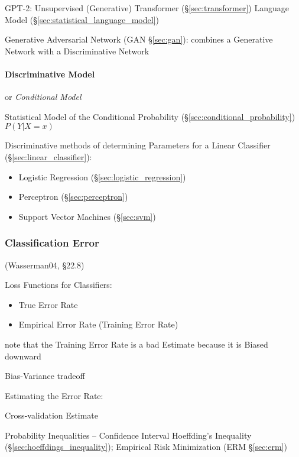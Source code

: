 GPT-2: Unsupervised (Generative) Transformer (\S\ref{sec:transformer}) Language
Model (\S\ref{sec:statistical_language_model})

\fist Generative Adversarial Network (GAN \S\ref{sec:gan}): combines a
Generative Network with a Discriminative Network



\paragraph{Discriminative Model}\label{sec:discriminative_model}\hfill

or \emph{Conditional Model}

Statistical Model of the Conditional Probability
(\S\ref{sec:conditional_probability}) $P(Y | X = x)$

Discriminative methods of determining Parameters for a Linear Classifier
(\S\ref{sec:linear_classifier}):
\begin{itemize}
  \item Logistic Regression (\S\ref{sec:logistic_regression})
  \item Perceptron (\S\ref{sec:perceptron})
  \item Support Vector Machines (\S\ref{sec:svm})
\end{itemize}



\subsubsection{Classification Error}\label{sec:classification_error}

(Wasserman04, \S22.8)

Loss Functions for Classifiers:
\begin{itemize}
  \item True Error Rate
  \item Empirical Error Rate (Training Error Rate)
\end{itemize}

note that the Training Error Rate is a bad Estimate because it is Biased
downward

Bias-Variance tradeoff

Estimating the Error Rate:

Cross-validation Estimate

Probability Inequalities -- Confidence Interval \fist Hoeffding's Inequality
(\S\ref{sec:hoeffdings_inequality}); Empirical Risk Minimization (ERM
\S\ref{sec:erm})



